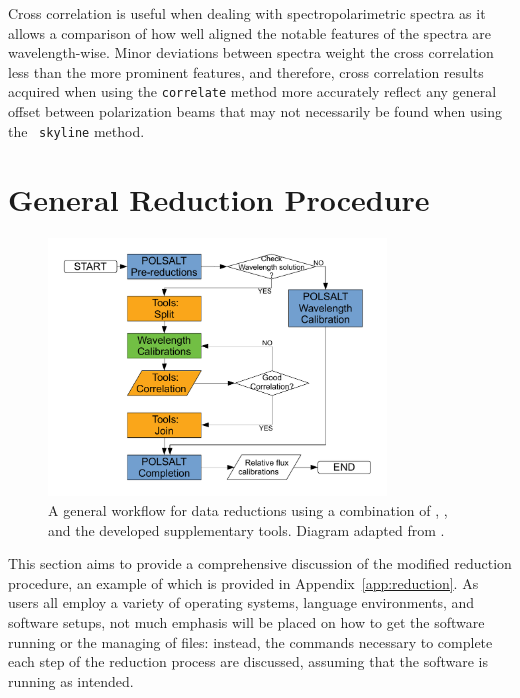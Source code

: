 Cross correlation is useful when dealing with spectropolarimetric spectra as it allows a comparison of how well aligned the notable features of the spectra are wavelength-wise. Minor deviations between spectra weight the cross correlation less than the more prominent features, and therefore, cross correlation results acquired when using the \texttt{correlate} method more accurately reflect any general offset between polarization beams that may not necessarily be found when using the \stops\ \texttt{skyline} method.

\section{General Reduction Procedure}\label{sec:red_proc}

\begin{figure}[t]
    \centering
    \includegraphics[width = 0.8\textwidth]{figures/3_new_workflow.pdf}
    \caption{A general workflow for data reductions using a combination of \polsalt, \iraf, and the developed supplementary tools. Diagram adapted from \cite{cooper_HEASA2022}.}
    \label{fig:new_workflow}
\end{figure}

This section aims to provide a comprehensive discussion of the modified reduction procedure, an example of which is provided in Appendix~\ref{app:reduction}. As users all employ a variety of operating systems, language environments, and software setups, not much emphasis will be placed on how to get the software running or the managing of files: instead, the commands necessary to complete each step of the reduction process are discussed, assuming that the software is running as intended.


